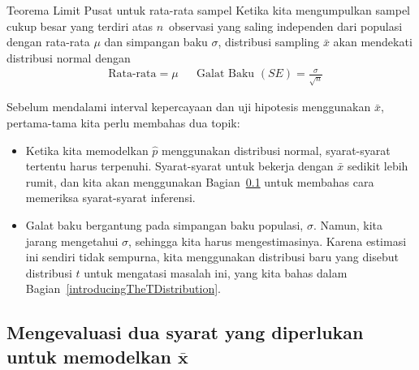 \begin{onebox}{Teorema Limit Pusat untuk rata-rata sampel}
  Ketika kita mengumpulkan sampel cukup besar yang terdiri atas
  $n$~observasi yang saling independen dari populasi dengan
  rata-rata $\mu$ dan simpangan baku $\sigma$,
  distribusi sampling $\bar{x}$ akan mendekati
  distribusi normal dengan
  \begin{align*}
  &\text{Rata-rata}=\mu
  &&\text{Galat Baku }(SE) = \frac{\sigma}{\sqrt{n}}
  \end{align*}
\end{onebox}

\noindent%
Sebelum mendalami interval kepercayaan dan uji
hipotesis menggunakan $\bar{x}$, pertama-tama kita perlu membahas dua topik:
\begin{itemize}
\item
    Ketika kita memodelkan $\hat{p}$ menggunakan distribusi normal,
    syarat-syarat tertentu harus terpenuhi.
    Syarat-syarat untuk bekerja dengan $\bar{x}$
    sedikit lebih rumit, dan kita akan menggunakan
    Bagian~\ref{x_bar_conditions} untuk membahas
    cara memeriksa syarat-syarat inferensi.
\item
    Galat baku bergantung pada simpangan
    baku populasi, $\sigma$.
    Namun, kita jarang mengetahui $\sigma$, sehingga
    kita harus mengestimasinya.
    Karena estimasi ini sendiri tidak sempurna,
    kita menggunakan distribusi baru yang disebut
    distribusi $t$
    untuk mengatasi masalah ini, yang kita bahas dalam
    Bagian~\ref{introducingTheTDistribution}.
\end{itemize}


\subsection[Mengevaluasi dua syarat yang diperlukan untuk
    memodelkan $\bar{x}$]
  {Mengevaluasi dua syarat yang diperlukan untuk
      memodelkan $\pmb{\bar{x}}$}
\label{x_bar_conditions}

